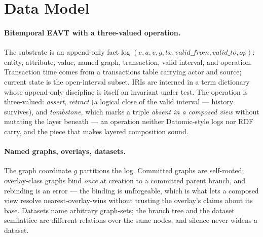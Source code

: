 \section{Data Model}
\label{sec:datamodel}

\paragraph{Bitemporal EAVT with a three-valued operation.}
The substrate is an append-only fact log
$(e, a, v, g, tx, \mathit{valid\_from}, \mathit{valid\_to}, op)$:
entity, attribute, value, named graph, transaction, valid interval,
and operation. Transaction time comes from a transactions table
carrying actor and source; current state is the open-interval subset.
IRIs are interned in a term dictionary whose append-only discipline is
itself an invariant under test. The operation is three-valued:
\emph{assert}, \emph{retract} (a logical close of the valid interval ---
history survives), and \emph{tombstone}, which marks a triple
\emph{absent in a composed view} without mutating the layer beneath ---
an operation neither Datomic-style logs nor RDF carry, and the piece
that makes layered composition sound.

\paragraph{Named graphs, overlays, datasets.}
The graph coordinate $g$ partitions the log. Committed graphs are
self-rooted; overlay-class graphs bind \emph{once} at creation to a
committed parent branch, and rebinding is an error --- the binding is
unforgeable, which is what lets a composed view resolve
nearest-overlay-wins without trusting the overlay's claims about its
base. Datasets name arbitrary graph-sets; the branch tree and the
dataset semilattice are different relations over the same nodes, and
silence never widens a dataset.

